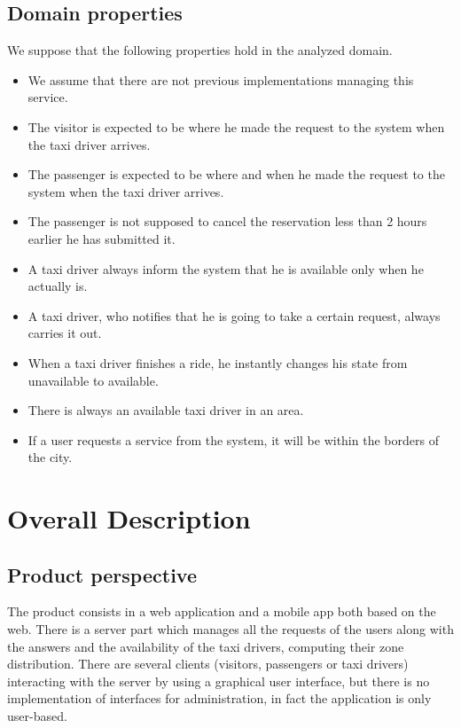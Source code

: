 \documentclass[18pt,oneside,a4paper, titlepage]{article}
\begin{document}
	\subsection{Domain properties}
	We suppose that the following properties hold in the analyzed domain.
	\begin{itemize}
		\item We assume that there are not previous implementations managing this service.
		\item The visitor is expected to be where he made the request to the system when the taxi driver arrives.
		\item The passenger is expected to be where and when he made the request to the system when the taxi driver arrives.
		\item The passenger is not supposed to cancel the reservation less than 2 hours earlier he has submitted it.
		\item A taxi driver always inform the system that he is available only when he actually is.
		\item A taxi driver, who notifies that he is going to take a certain request, always carries it out.
		\item When a taxi driver finishes a ride, he instantly changes his state from unavailable to available.
		\item There is always an available taxi driver in an area.
		\item If a user requests a service from the system, it will be within the borders of the city.
		
	\end{itemize}


\newpage
\section{Overall Description}
	\subsection{Product perspective}
	The product consists in a web application and a mobile app both based on the web. There is a server part which manages all the requests of the users along with the answers and the availability of the taxi drivers, computing their zone distribution. There are several clients (visitors, passengers or taxi drivers) interacting with the server by using a graphical user interface, but there is no implementation of interfaces for administration, in fact the application is only user-based.
	
\end{document}
